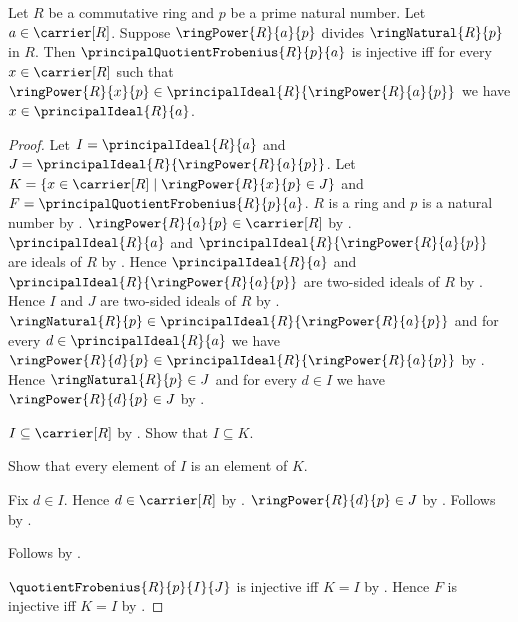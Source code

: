 \begin{theorem}\label{principal_quotient_frobenius_injective_iff}
    Let $R$ be a commutative ring and $p$ be a prime natural number.
    Let $a\in\carrier[R]$.
    Suppose $\ringPower{R}{a}{p}$ divides $\ringNatural{R}{p}$ in $R$.
    Then $\principalQuotientFrobenius{R}{p}{a}$ is injective iff
        for every $x\in\carrier[R]$ such that
            $\ringPower{R}{x}{p}
                \in\principalIdeal{R}{\ringPower{R}{a}{p}}$
        we have $x\in\principalIdeal{R}{a}$.
\end{theorem}
\begin{proof}
    Let $I=\principalIdeal{R}{a}$ and
        $J=\principalIdeal{R}{\ringPower{R}{a}{p}}$.
    Let $K=\{x\in\carrier[R]\mid\ringPower{R}{x}{p}\in J\}$ and
        $F=\principalQuotientFrobenius{R}{p}{a}$.
    $R$ is a ring and $p$ is a natural number by
        .
    $\ringPower{R}{a}{p}\in\carrier[R]$ by .
    $\principalIdeal{R}{a}$ and
        $\principalIdeal{R}{\ringPower{R}{a}{p}}$
        are ideals of $R$ by .
    Hence $\principalIdeal{R}{a}$ and
        $\principalIdeal{R}{\ringPower{R}{a}{p}}$
        are two-sided ideals of $R$ by .
    Hence $I$ and $J$ are two-sided ideals of $R$ by \auto.
    $\ringNatural{R}{p}
            \in\principalIdeal{R}{\ringPower{R}{a}{p}}$ and
        for every $d\in\principalIdeal{R}{a}$ we have
            $\ringPower{R}{d}{p}
                \in\principalIdeal{R}{\ringPower{R}{a}{p}}$ by
        .
    Hence $\ringNatural{R}{p}\in J$ and
        for every $d\in I$ we have $\ringPower{R}{d}{p}\in J$ by
        \auto.

    $I\subseteq\carrier[R]$ by
        .
    Show that $I\subseteq K$.
    \begin{subproof}
        Show that every element of $I$ is an element of $K$.
        \begin{subproof}
            Fix $d\in I$.
            Hence $d\in\carrier[R]$ by .
            $\ringPower{R}{d}{p}\in J$ by \auto.
            Follows by \auto.
        \end{subproof}
        Follows by .
    \end{subproof}

    $\quotientFrobenius{R}{p}{I}{J}$ is injective iff $K=I$ by
        .
    Hence $F$ is injective iff $K=I$ by
        .


\end{proof}
